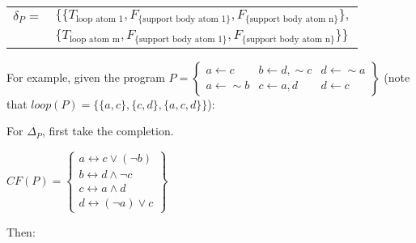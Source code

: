\documentclass[9pt,a4paper,landscape]{article}
\newcommand{\ngfb}[1]{F_{ \{#1\} }}
\newcommand{\ngta}[1]{T_{#1}}
\begin{document}
{\begin{center}
	\begin{tabular}{rl}
		$\delta_P =$ 	& $\{ \{ \ngta{\text{loop atom 1}}, \ngfb{\text{support body atom 1}}, \ngfb{\text{support body atom n}} \},$ \\
						& $\{ \ngta{\text{loop atom m}}, \ngfb{\text{support body atom 1}}, \ngfb{\text{support body atom n}} \} \}$ \\
	\end{tabular}
\end{center}


\vspace{\baselineskip}

For example, given the program $P = \left\{\begin{array}{lll}
a \leftarrow c & b \leftarrow d, {\sim} c & d \leftarrow {\sim} a\\
a \leftarrow {\sim} b & c \leftarrow a, d & d \leftarrow c
\end{array}\right\}$ (note that $loop(P) = \{ \{a, c\}, \{c, d\}, \{a, c, d\} \}$):

For $\Delta_P$, first take the completion.

\begin{center}
	$CF(P) = \left\{\begin{array}{l}
a \leftrightarrow c \lor (\neg b) \\
b \leftrightarrow d \land \neg c \\
c \leftrightarrow a \land d \\
d \leftrightarrow (\neg a) \lor c
\end{array}\right\}$
\end{center}

\pagebreak

Then:

}
\end{document}

